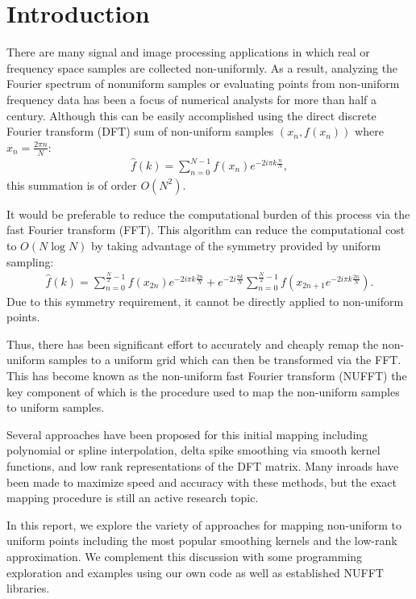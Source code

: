 \section{Introduction}

There are many signal and image processing applications in which real or frequency space samples are collected non-uniformly.
As a result, analyzing the Fourier spectrum of nonuniform samples or evaluating points from non-uniform frequency data has been a focus of numerical analysts for more than half a century. %
Although this can be easily accomplished using the direct discrete Fourier transform (DFT) sum of non-uniform samples $(x_n, f(x_n))$ where $x_n = \frac{2\pi n}{N}$:
\begin{align*}
  \hat{f}(k) = \sum_{n=0}^{N-1} f(x_n) e^{-2i \pi k \frac{n}{N}}
,\end{align*}
this summation is of order $O(N^{2})$.

It would be preferable to reduce the computational burden of this process via the fast Fourier transform (FFT).
This algorithm can reduce the computational cost to $O(N\log{N})$ by taking advantage of the symmetry provided by uniform sampling:
\begin{align*}
  \hat{f}(k) = \sum_{n=0}^{\frac{N}{2}-1} f(x_{2n})e^{-2i \pi k \frac{2n}{N}} + e^{-2i\frac{\pi k}{N}} \sum_{n=0}^{\frac{N}{2}-1} f(x_{2n+1}e^{-2i \pi k \frac{2n}{N}})
.\end{align*}
Due to this symmetry requirement, it cannot be directly applied to non-uniform points.

Thus, there has been significant effort to accurately and cheaply remap the non-uniform samples to a uniform grid which can then be transformed via the FFT.
This has become known as the non-uniform fast Fourier transform (NUFFT) the key component of which is the procedure used to map the non-uniform samples to uniform samples.

Several approaches have been proposed for this initial mapping including polynomial or spline interpolation, delta spike smoothing via smooth kernel functions, and low rank representations of the DFT matrix. %
Many inroads have been made to maximize speed and accuracy with these methods, but the exact mapping procedure is still an active research topic.

In this report, we explore the variety of approaches for mapping non-uniform to uniform points including the most popular smoothing kernels and the low-rank approximation.
We complement this discussion with some programming exploration and examples using our own code as well as established NUFFT libraries.
